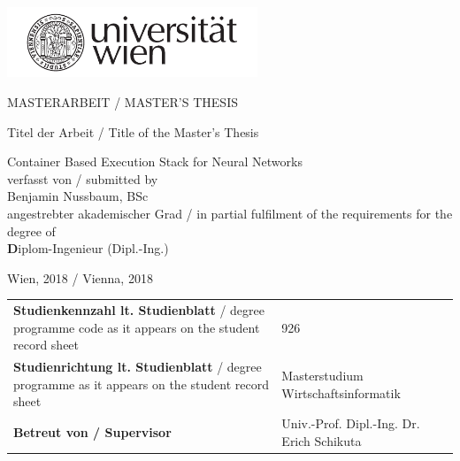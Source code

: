 
\pagestyle{empty}

\clearscrheadings\clearscrplain

\begin{flushright} 
	\includegraphics[width=75mm]{images/logo_uniwien.pdf}\\
\end{flushright}

\begin{center}
\begin{Huge}
MASTERARBEIT / MASTER'S THESIS\\
\vspace{3mm}
\end{Huge}

\vspace{10mm}
{\small Titel der Arbeit / Title of the Master's Thesis}\\
\begin{Large}
Container Based Execution Stack for Neural Networks\\
\vspace{15mm}
{\small verfasst von / submitted by}\\
Benjamin Nussbaum, BSc \\

\vspace{10mm}
{\small angestrebter akademischer Grad / in partial fulfilment of the requirements for the degree of} \\
{\textbf Diplom-Ingenieur} (Dipl.-Ing.)\\
\end{Large}
\end{center}

\vspace{8mm}

Wien, 2018 / Vienna, 2018\\[12mm]
\renewcommand{\arraystretch}{1.2}
\begin{tabular}{p{8cm}ll}
{\textbf{Studienkennzahl lt. Studienblatt} / \newline
degree programme code as it appears on \newline the student record sheet} & 926 \\
{\textbf{Studienrichtung lt. Studienblatt} / \newline degree programme as it appears on \newline the student record sheet} & Masterstudium Wirtschaftsinformatik  \\
{\textbf{Betreut von / Supervisor}} & Univ.-Prof. Dipl.-Ing. Dr. Erich Schikuta
\end{tabular}


